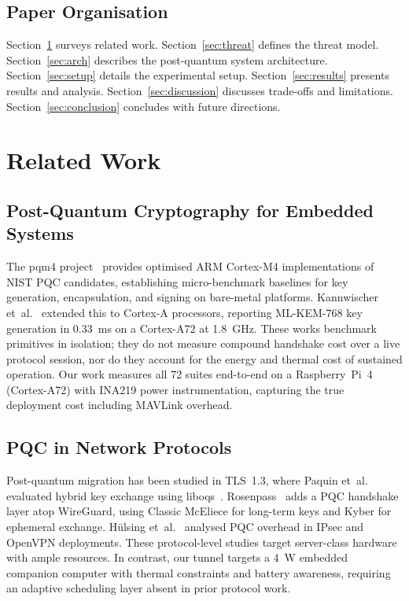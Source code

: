 \documentclass[conference]{IEEEtran}
\newcommand{\etal}{et~al.\xspace}
\begin{document}
\subsection{Paper Organisation}

Section~\ref{sec:related} surveys related work.
Section~\ref{sec:threat} defines the threat model.
Section~\ref{sec:arch} describes the post-quantum system architecture.
Section~\ref{sec:setup} details the experimental setup.
Section~\ref{sec:results} presents results and analysis.
Section~\ref{sec:discussion} discusses trade-offs and limitations.
Section~\ref{sec:conclusion} concludes with future directions.

\section{Related Work}
\label{sec:related}

\subsection{Post-Quantum Cryptography for Embedded Systems}

The pqm4 project~\cite{pqm4} provides optimised ARM Cortex-M4 implementations of NIST PQC candidates, establishing micro-benchmark baselines for key generation, encapsulation, and signing on bare-metal platforms.
Kannwischer \etal~\cite{pqc-arm-bench} extended this to Cortex-A processors, reporting ML-KEM-768 key generation in \SI{0.33}{\milli\second} on a Cortex-A72 at \SI{1.8}{\giga\hertz}.
These works benchmark primitives in isolation; they do not measure compound handshake cost over a live protocol session, nor do they account for the energy and thermal cost of sustained operation.
Our work measures all 72 suites end-to-end on a Raspberry~Pi~4 (Cortex-A72) with INA219 power instrumentation, capturing the true deployment cost including MAVLink overhead.

\subsection{PQC in Network Protocols}

Post-quantum migration has been studied in TLS~1.3, where Paquin \etal~\cite{pqc-tls-bench} evaluated hybrid key exchange using liboqs~\cite{liboqs}.
Rosenpass~\cite{rosenpass} adds a PQC handshake layer atop WireGuard, using Classic McEliece for long-term keys and Kyber for ephemeral exchange.
Hülsing \etal~\cite{pqc-vpn} analysed PQC overhead in IPsec and OpenVPN deployments.
These protocol-level studies target server-class hardware with ample resources.
In contrast, our tunnel targets a \SI{4}{\watt} embedded companion computer with thermal constraints and battery awareness, requiring an adaptive scheduling layer absent in prior protocol work.
\end{document}
